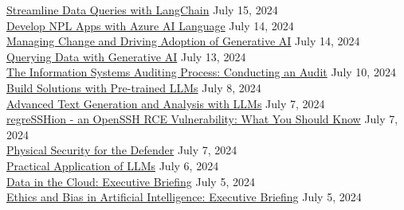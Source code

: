 \documentclass[10pt]{res} %
\begin{document}
\begin{resume}
\href{https://bjdelacruz.dev/files/certificates/pluralsight/Streamline_Data_Queries_with_LangChain.pdf}{\color{blue}Streamline Data Queries with LangChain} \hfill July 15, 2024 \\
\href{https://bjdelacruz.dev/files/certificates/pluralsight/Develop_NPL_Apps_with_Azure_AI_Language.pdf}{\color{blue}Develop NPL Apps with Azure AI Language} \hfill July 14, 2024 \\
\href{https://bjdelacruz.dev/files/certificates/pluralsight/Managing_Change_and_Driving_Adoption_of_Generative_AI.pdf}{\color{blue}Managing Change and Driving Adoption of Generative AI} \hfill July 14, 2024 \\
\href{https://bjdelacruz.dev/files/certificates/pluralsight/Querying_Data_with_Generative_AI.pdf}{\color{blue}Querying Data with Generative AI} \hfill July 13, 2024 \\
\href{https://bjdelacruz.dev/files/certificates/pluralsight/The_Information_Systems_Auditing_Process_-_Conducting_an_Audit.pdf}{\color{blue}The Information Systems Auditing Process: Conducting an Audit} \hfill July 10, 2024 \\
\href{https://bjdelacruz.dev/files/certificates/pluralsight/Build_Solutions_with_Pre-trained_LLMs.pdf}{\color{blue}Build Solutions with Pre-trained LLMs} \hfill July 8, 2024 \\
\href{https://bjdelacruz.dev/files/certificates/pluralsight/Advanced_Text_Generation_and_Analysis_with_LLMs.pdf}{\color{blue}Advanced Text Generation and Analysis with LLMs} \hfill July 7, 2024 \\
\href{https://bjdelacruz.dev/files/certificates/pluralsight/regreSSHion_-_an_OpenSSH_RCE_Vulnerability_-_What_You_Should_Know.pdf}{\color{blue}regreSSHion - an OpenSSH RCE Vulnerability: What You Should Know} \hfill July 7, 2024 \\
\href{https://bjdelacruz.dev/files/certificates/pluralsight/Physical_Security_for_the_Defender.pdf}{\color{blue}Physical Security for the Defender} \hfill July 7, 2024 \\
\href{https://bjdelacruz.dev/files/certificates/pluralsight/Practical_Application_of_LLMs.pdf}{\color{blue}Practical Application of LLMs} \hfill July 6, 2024 \\
\href{https://bjdelacruz.dev/files/certificates/pluralsight/Data_in_the_Cloud_-_Executive_Briefing.pdf}{\color{blue}Data in the Cloud: Executive Briefing} \hfill July 5, 2024 \\
\href{https://bjdelacruz.dev/files/certificates/pluralsight/Ethics_and_Bias_in_Artificial_Intelligence_-_Executive_Briefing.pdf}{\color{blue}Ethics and Bias in Artificial Intelligence: Executive Briefing} \hfill July 5, 2024 \\

\end{resume}
\end{document}
